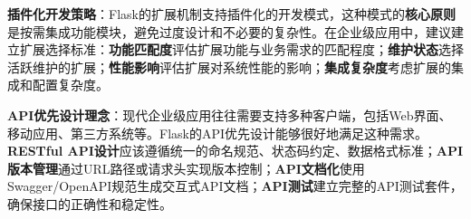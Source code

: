 \textbf{插件化开发策略}：Flask的扩展机制支持插件化的开发模式，这种模式的\textbf{核心原则}是按需集成功能模块，避免过度设计和不必要的复杂性。在企业级应用中，建议建立扩展选择标准：\textbf{功能匹配度}评估扩展功能与业务需求的匹配程度；\textbf{维护状态}选择活跃维护的扩展；\textbf{性能影响}评估扩展对系统性能的影响；\textbf{集成复杂度}考虑扩展的集成和配置复杂度。

\textbf{API优先设计理念}：现代企业级应用往往需要支持多种客户端，包括Web界面、移动应用、第三方系统等。Flask的API优先设计能够很好地满足这种需求。\textbf{RESTful API设计}应该遵循统一的命名规范、状态码约定、数据格式标准；\textbf{API版本管理}通过URL路径或请求头实现版本控制；\textbf{API文档化}使用Swagger/OpenAPI规范生成交互式API文档；\textbf{API测试}建立完整的API测试套件，确保接口的正确性和稳定性。

\begin{Shaded}
\begin{Highlighting}[]

\OperatorTok{=}\NormalTok{)}
\OperatorTok{=}
\OperatorTok{=}

\OperatorTok{=}\OperatorTok{=}\NormalTok{)}
\OperatorTok{=}\OperatorTok{=}\NormalTok{)}
\OperatorTok{=}\OperatorTok{=}\NormalTok{)}

     \NormalTok{(}\NormalTok{):}
        \OperatorTok{=}
    

\end{Highlighting}
\end{Shaded}
